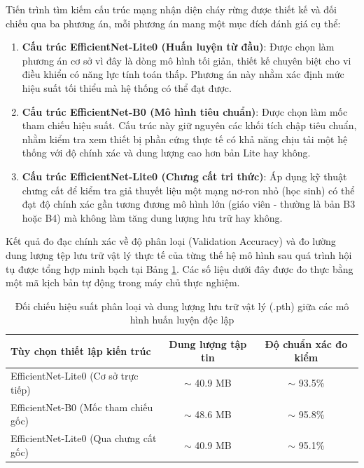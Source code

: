 \documentclass[12pt,a4paper]{report}
\begin{document}
Tiến trình tìm kiếm cấu trúc mạng nhận diện cháy rừng được thiết kế và đối chiếu qua ba phương án, mỗi phương án mang một mục đích đánh giá cụ thể:
\begin{enumerate}
    \item \textbf{Cấu trúc EfficientNet-Lite0 (Huấn luyện từ đầu)}: Được chọn làm phương án cơ sở vì đây là dòng mô hình tối giản, thiết kế chuyên biệt cho vi điều khiển có năng lực tính toán thấp. Phương án này nhằm xác định mức hiệu suất tối thiểu mà hệ thống có thể đạt được.
    \item \textbf{Cấu trúc EfficientNet-B0 (Mô hình tiêu chuẩn)}: Được chọn làm mốc tham chiếu hiệu suất. Cấu trúc này giữ nguyên các khối tích chập tiêu chuẩn, nhằm kiểm tra xem thiết bị phần cứng thực tế có khả năng chịu tải một hệ thống với độ chính xác và dung lượng cao hơn bản Lite hay không.
    \item \textbf{Cấu trúc EfficientNet-Lite0 (Chưng cất tri thức)}: Áp dụng kỹ thuật chưng cất \cite{hinton2015distilling} để kiểm tra giả thuyết liệu một mạng nơ-ron nhỏ (học sinh) có thể đạt độ chính xác gần tương đương mô hình lớn (giáo viên - thường là bản B3 hoặc B4) mà không làm tăng dung lượng lưu trữ hay không.
\end{enumerate}

Kết quả đo đạc chính xác về độ phân loại (Validation Accuracy) và đo lường dung lượng tệp lưu trữ vật lý thực tế của từng thế hệ mô hình sau quá trình hội tụ được tổng hợp minh bạch tại Bảng \ref{tab:training_options}. Các số liệu dưới đây được đo thực bằng một mã kịch bản tự động trong máy chủ thực nghiệm.

\begin{table}[h]
  \centering
  \caption{Đối chiếu hiệu suất phân loại và dung lượng lưu trữ vật lý (.pth) giữa các mô hình huấn luyện độc lập}
  \label{tab:training_options}
  \begin{tabular}{lcc}
    \toprule
    \textbf{Tùy chọn thiết lập kiến trúc} & \textbf{Dung lượng tập tin} & \textbf{Độ chuẩn xác đo kiểm} \\
    \midrule
    EfficientNet-Lite0 (Cơ sở trực tiếp) & $\sim$ 40.9 MB & $\sim$ 93.5\% \\
    EfficientNet-B0 (Mốc tham chiếu gốc) & $\sim$ 48.6 MB & $\sim$ 95.8\% \\
    EfficientNet-Lite0 (Qua chưng cất gốc) & $\sim$ 40.9 MB & $\sim$ 95.1\% \\
    \bottomrule
  \end{tabular}
\end{table}
\end{document}
